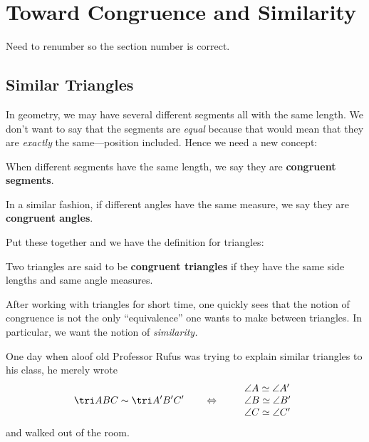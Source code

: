 
\newpage

\chapter{Toward Congruence and Similarity}
Need to renumber so the section number is correct. 

\section{Similar Triangles}


In geometry, we may have several different segments all with the same
length. We don't want to say that the segments are \textit{equal}
because that would mean that they are \textit{exactly} the
same---position included. Hence we need a new concept:

\begin{definition}
When different segments have the same length, we say they are
\textbf{congruent segments}. 
\end{definition}

\begin{definition}
In a similar fashion, if different angles have the same measure, we
say they are \textbf{congruent angles}.
\end{definition}

Put these together and we have the definition for triangles:

\begin{definition} 
Two triangles are said to be \textbf{congruent triangles} if they have
the same side lengths and same angle measures.
\end{definition}

After working with triangles for short time, one quickly sees that the
notion of congruence is not the only ``equivalence'' one wants to
make between triangles. In particular, we want the notion of
\textit{similarity.} 

One day when aloof old Professor Rufus was trying to explain similar
triangles to his class, he merely wrote
\[
\tri ABC \sim \tri A'B'C' \qquad\Leftrightarrow \qquad\begin{array}{l}
\angle A \simeq \angle A'\\
\angle B \simeq \angle B' \\
\angle C \simeq \angle C'
\end{array}
\]
and walked out of the room.

